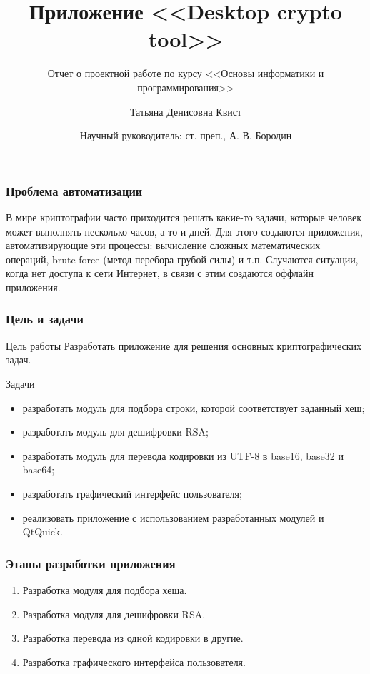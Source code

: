 \documentclass[hyperref={unicode}]{beamer}
\title[%
]{%
    Приложение <<Desktop crypto tool>>
}
\subtitle{Отчет о проектной работе по курсу <<Основы информатики и программирования>>}
\author[%
    Татьяна Квист
]{%
    Татьяна Денисовна Квист
}
\date[%
    28.05.2021
]{%
    Научный руководитель: ст. преп., А. В. Бородин
}
\institute[%
    ПетрГУ
]{%
    Петрозаводский государственный университет\\
    Кафедра информатики и математического обеспечения
}
\begin{document}
\begin{frame}
\maketitle
\end{frame}

\begin{frame}
  \frametitle{Проблема автоматизации}
  В мире криптографии часто приходится решать какие-то задачи, которые человек может выполнять несколько часов, а то и дней. Для этого создаются приложения, автоматизирующие эти процессы: вычисление сложных математических операций, brute-force (метод перебора грубой силы) и т.п. Случаются ситуации, когда нет доступа к сети Интернет, в связи с этим создаются оффлайн приложения.
\end{frame}

\begin{frame}
  \frametitle{Цель и задачи}
  \begin{block}{Цель работы}
    Разработать приложение для решения основных криптографических задач.
  \end{block}
  \begin{block}{Задачи}
  \begin{itemize}
    \item разработать модуль для подбора строки, которой соответствует заданный хеш;
    \item разработать модуль для дешифровки RSA;
    \item разработать модуль для перевода кодировки из UTF-8 в base16, base32 и base64;
    \item разработать графический интерфейс пользователя;
    \item реализовать приложение с использованием разработанных модулей и QtQuick.
  \end{itemize}
  \end{block}
\end{frame}

\begin{frame}
    \frametitle{Этапы разработки приложения}
    \begin{enumerate}
        \item Разработка модуля для подбора хеша.
        \item Разработка модуля для дешифровки RSA.
        \item Разработка перевода из одной кодировки в другие.
        \item Разработка графического интерфейса пользователя.
    \end{enumerate}
\end{frame}
  
\end{document}
